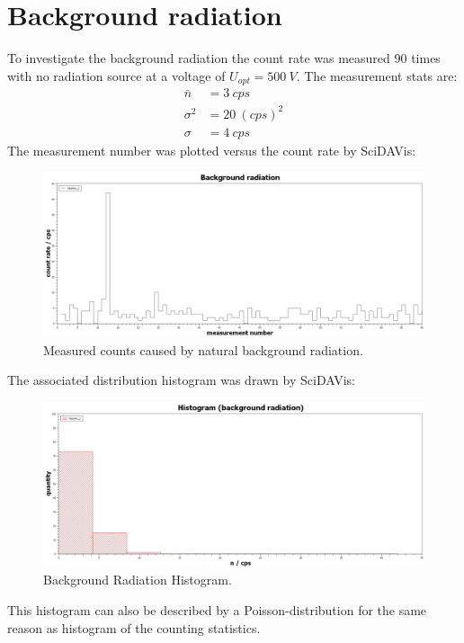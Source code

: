 \section{Background radiation}
%
To investigate the background radiation the count rate was measured 90 times with no radiation source at a voltage of
\( U_{opt}=\SI{500}{V} \). The measurement stats are:
%
\begin{align}
    \bar{n}     &=  \SI{3}{cps} \\
    \sigma^{2}  &=  \SI{20}{(cps)^{2}} \\
    \sigma      &=  \SI{4}{cps}
\end{align}
The measurement number was plotted versus the count rate by SciDAVis:
\begin{figure}[h]
    \centering
    \includegraphics[width=.8\textwidth]{scidavis/Fig.10_Background radiation.jpg}
    \caption[Background radiation cps]{Measured counts caused by natural background radiation.}
    \label{fig:backgroundRad}
\end{figure}
The associated distribution histogram was drawn by SciDAVis:
\begin{figure}[h]
    \centering
    \includegraphics[width=.8\textwidth]{scidavis/Fig.11_Histogram (background radiation).jpg}
    \caption[Back Rad Hist]{Background Radiation Histogram.}
    \label{fig:backgroundRadHistogram}
\end{figure}
This histogram can also be described by a Poisson-distribution for the same reason as histogram of the counting
statistics.
%

